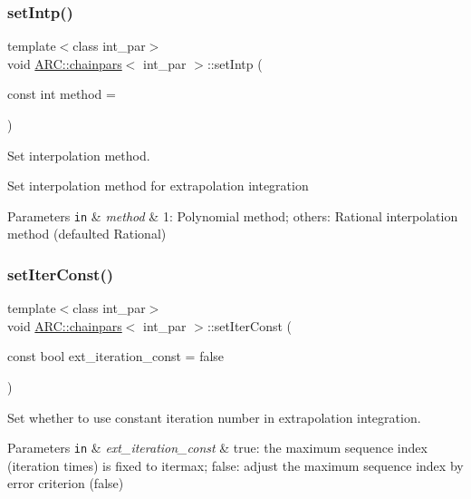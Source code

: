 \subsubsection{\texorpdfstring{set\+Intp()}{setIntp()}}
{\footnotesize\ttfamily template$<$class int\+\_\+par$>$ \\
void \hyperlink{classARC_1_1chainpars}{A\+R\+C\+::chainpars}$<$ int\+\_\+par $>$\+::set\+Intp (\begin{DoxyParamCaption}\item[{const int}]{method = {} }\end{DoxyParamCaption})\hspace{0.3cm}{\ttfamily [inline]}}



Set interpolation method. 

Set interpolation method for extrapolation integration 
\begin{DoxyParams}[1]{Parameters}
\mbox{\tt in}  & {\em method} & 1\+: Polynomial method; others\+: Rational interpolation method (defaulted Rational) \\
\hline
\end{DoxyParams}
\hypertarget{classARC_1_1chainpars_a84fe5bb032696dae76ce1aa9e6dd1a63}{}\label{classARC_1_1chainpars_a84fe5bb032696dae76ce1aa9e6dd1a63} 
\subsubsection{\texorpdfstring{set\+Iter\+Const()}{setIterConst()}}
{\footnotesize\ttfamily template$<$class int\+\_\+par$>$ \\
void \hyperlink{classARC_1_1chainpars}{A\+R\+C\+::chainpars}$<$ int\+\_\+par $>$\+::set\+Iter\+Const (\begin{DoxyParamCaption}\item[{const bool}]{ext\+\_\+iteration\+\_\+const = {\ttfamily false} }\end{DoxyParamCaption})\hspace{0.3cm}{\ttfamily [inline]}}



Set whether to use constant iteration number in extrapolation integration. 


\begin{DoxyParams}[1]{Parameters}
\mbox{\tt in}  & {\em ext\+\_\+iteration\+\_\+const} & true\+: the maximum sequence index (iteration times) is fixed to itermax; false\+: adjust the maximum sequence index by error criterion (false) \\
\hline
\end{DoxyParams}
\hypertarget{classARC_1_1chainpars_a61cc2580dcf06d4e85e068272b4b5b95}{}\label{classARC_1_1chainpars_a61cc2580dcf06d4e85e068272b4b5b95} 
